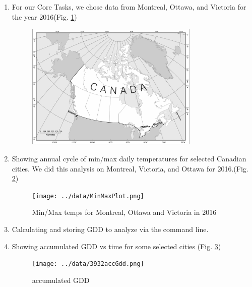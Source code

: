 \documentclass{article}
\begin{document}
\begin{enumerate}
\item For our Core Tasks, we chose data from Montreal, Ottawa, and Victoria for the year 2016(Fig. \ref{Canada})

\begin{center}
\begin{figure}[H]
\centering
\includegraphics[width=3.25in]{Canada_final.jpg}

\caption{}
\label{Canada}
\end{figure}
\end{center}

 
\item  Showing annual cycle of min/max daily temperatures for selected Canadian cities. We did this analysis on Montreal, Victoria, and Ottawa for 2016.(Fig. \ref{min-max})
\begin{center}
\begin{figure}[H]
\centering
\texttt{[image: ../data/MinMaxPlot.png]}

\caption{Min/Max temps for Montreal, Ottawa and Victoria in 2016}
\label{min-max}
\end{figure}
\end{center}

\item Calculating and storing GDD to analyze via the command line.
\item  Showing accumulated GDD vs time for some selected cities 
(Fig. \ref{accumulatedGdd})
\begin{center}
\begin{figure}[H]
\centering
\texttt{[image: ../data/3932accGdd.png]}

\caption{accumulated GDD }
\label{accumulatedGdd}
\end{figure}
\end{center}
\end{enumerate}
\end{document}
